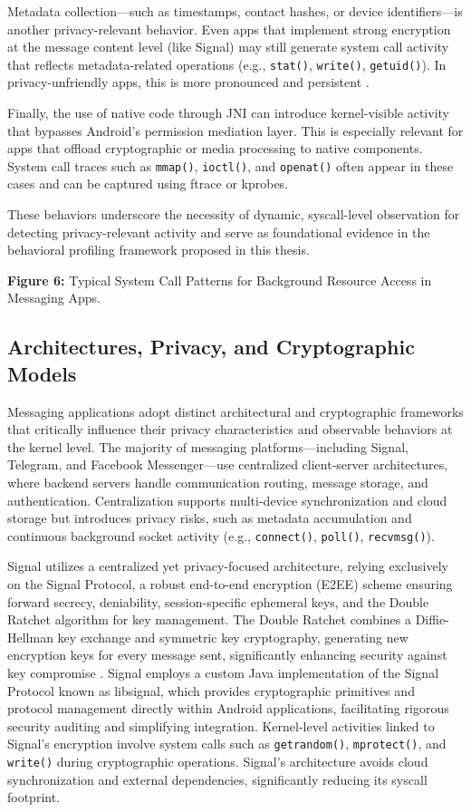\documentclass[a4paper,12pt]{report}
\begin{document}
Metadata collection—such as timestamps, contact hashes, or device identifiers—is another privacy-relevant behavior. Even apps that implement strong encryption at the message content level (like Signal) may still generate system call activity that reflects metadata-related operations (e.g., \texttt{stat()}, \texttt{write()}, \texttt{getuid()}). In privacy-unfriendly apps, this is more pronounced and persistent \cite{signalprivacy2016}.

Finally, the use of native code through JNI can introduce kernel-visible activity that bypasses Android’s permission mediation layer. This is especially relevant for apps that offload cryptographic or media processing to native components. System call traces such as \texttt{mmap()}, \texttt{ioctl()}, and \texttt{openat()} often appear in these cases and can be captured using ftrace or kprobes.

These behaviors underscore the necessity of dynamic, syscall-level observation for detecting privacy-relevant activity and serve as foundational evidence in the behavioral profiling framework proposed in this thesis.

\textbf{Figure 6:} Typical System Call Patterns for Background Resource Access in Messaging Apps.

\subsection{Architectures, Privacy, and Cryptographic Models}
Messaging applications adopt distinct architectural and cryptographic frameworks that critically influence their privacy characteristics and observable behaviors at the kernel level. The majority of messaging platforms—including Signal, Telegram, and Facebook Messenger—use centralized client-server architectures, where backend servers handle communication routing, message storage, and authentication. Centralization supports multi-device synchronization and cloud storage but introduces privacy risks, such as metadata accumulation and continuous background socket activity (e.g., \texttt{connect()}, \texttt{poll()}, \texttt{recvmsg()}).

Signal utilizes a centralized yet privacy-focused architecture, relying exclusively on the Signal Protocol, a robust end-to-end encryption (E2EE) scheme ensuring forward secrecy, deniability, session-specific ephemeral keys, and the Double Ratchet algorithm for key management. The Double Ratchet combines a Diffie-Hellman key exchange and symmetric key cryptography, generating new encryption keys for every message sent, significantly enhancing security against key compromise \cite{signalwhitepaper}. Signal employs a custom Java implementation of the Signal Protocol known as libsignal, which provides cryptographic primitives and protocol management directly within Android applications, facilitating rigorous security auditing and simplifying integration. Kernel-level activities linked to Signal’s encryption involve system calls such as \texttt{getrandom()}, \texttt{mprotect()}, and \texttt{write()} during cryptographic operations. Signal's architecture avoids cloud synchronization and external dependencies, significantly reducing its syscall footprint.
\end{document}
